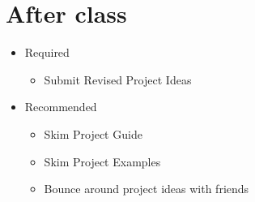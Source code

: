 \documentclass[11pt]{article}
\begin{document}
\section*{After class}

\begin{itemize}
\item Required
\begin{itemize}
\item Submit Revised Project Ideas
\end{itemize}
\item Recommended
\begin{itemize}
\item Skim Project Guide
\item Skim Project Examples
\item Bounce around project ideas with friends
\end{itemize}
\end{itemize}



\end{document}
